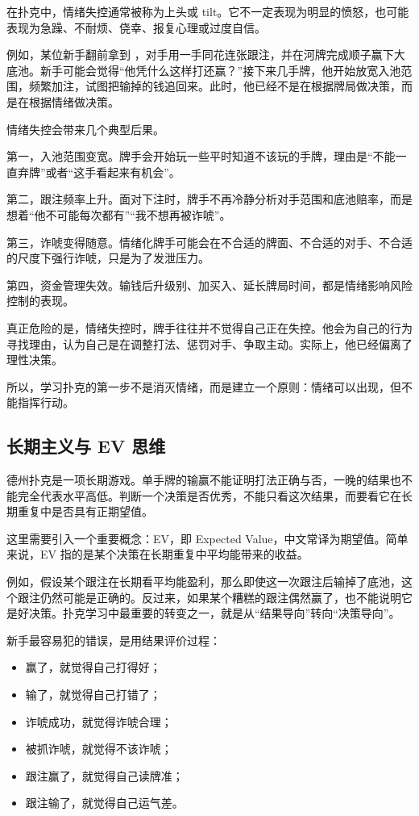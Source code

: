 在扑克中，情绪失控通常被称为上头或 tilt。它不一定表现为明显的愤怒，也可能表现为急躁、不耐烦、侥幸、报复心理或过度自信。

例如，某位新手翻前拿到 ，对手用一手同花连张跟注，并在河牌完成顺子赢下大底池。新手可能会觉得“他凭什么这样打还赢？”接下来几手牌，他开始放宽入池范围，频繁加注，试图把输掉的钱追回来。此时，他已经不是在根据牌局做决策，而是在根据情绪做决策。

情绪失控会带来几个典型后果。

第一，入池范围变宽。牌手会开始玩一些平时知道不该玩的手牌，理由是“不能一直弃牌”或者“这手看起来有机会”。

第二，跟注频率上升。面对下注时，牌手不再冷静分析对手范围和底池赔率，而是想着“他不可能每次都有”“我不想再被诈唬”。

第三，诈唬变得随意。情绪化牌手可能会在不合适的牌面、不合适的对手、不合适的尺度下强行诈唬，只是为了发泄压力。

第四，资金管理失效。输钱后升级别、加买入、延长牌局时间，都是情绪影响风险控制的表现。

真正危险的是，情绪失控时，牌手往往并不觉得自己正在失控。他会为自己的行为寻找理由，认为自己是在调整打法、惩罚对手、争取主动。实际上，他已经偏离了理性决策。

所以，学习扑克的第一步不是消灭情绪，而是建立一个原则：情绪可以出现，但不能指挥行动。

\subsection{长期主义与 EV 思维}

德州扑克是一项长期游戏。单手牌的输赢不能证明打法正确与否，一晚的结果也不能完全代表水平高低。判断一个决策是否优秀，不能只看这次结果，而要看它在长期重复中是否具有正期望值。

这里需要引入一个重要概念：EV，即 Expected Value，中文常译为期望值。简单来说，EV 指的是某个决策在长期重复中平均能带来的收益。

例如，假设某个跟注在长期看平均能盈利，那么即使这一次跟注后输掉了底池，这个跟注仍然可能是正确的。反过来，如果某个糟糕的跟注偶然赢了，也不能说明它是好决策。扑克学习中最重要的转变之一，就是从“结果导向”转向“决策导向”。

新手最容易犯的错误，是用结果评价过程：

\begin{itemize}
\item 赢了，就觉得自己打得好；
\item 输了，就觉得自己打错了；
\item 诈唬成功，就觉得诈唬合理；
\item 被抓诈唬，就觉得不该诈唬；
\item 跟注赢了，就觉得自己读牌准；
\item 跟注输了，就觉得自己运气差。
\end{itemize}

